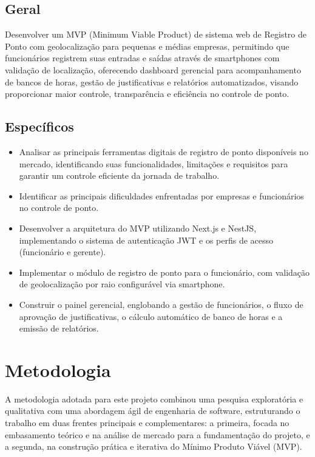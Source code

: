 \subsection{Geral}

Desenvolver um MVP (Minimum Viable Product) de sistema web de Registro de Ponto com geolocalização para pequenas e médias empresas, permitindo que funcionários registrem suas entradas e saídas através de smartphones com validação de localização, oferecendo dashboard gerencial para acompanhamento de bancos de horas, gestão de justificativas e relatórios automatizados, visando proporcionar maior controle, transparência e eficiência no controle de ponto.


\subsection{Específicos}
\begin{itemize}
    \item Analisar as principais ferramentas digitais de registro de ponto disponíveis no mercado, identificando suas funcionalidades, limitações e requisitos para garantir um controle eficiente da jornada de trabalho.
    \item Identificar as principais dificuldades enfrentadas por empresas e funcionários no controle de ponto.
    \item Desenvolver a arquitetura do MVP utilizando Next.js e NestJS, implementando o sistema de autenticação JWT e os perfis de acesso (funcionário e gerente).
    \item Implementar o módulo de registro de ponto para o funcionário, com validação de geolocalização por raio configurável via smartphone.
    \item Construir o painel gerencial, englobando a gestão de funcionários, o fluxo de aprovação de justificativas, o cálculo automático de banco de horas e a emissão de relatórios.
\end{itemize}

\section{Metodologia}

A metodologia adotada para este projeto combinou uma pesquisa exploratória e qualitativa com uma abordagem ágil de engenharia de software, estruturando o trabalho em duas frentes principais e complementares: a primeira, focada no embasamento teórico e na análise de mercado para a fundamentação do projeto, e a segunda, na construção prática e iterativa do Mínimo Produto Viável (MVP).


